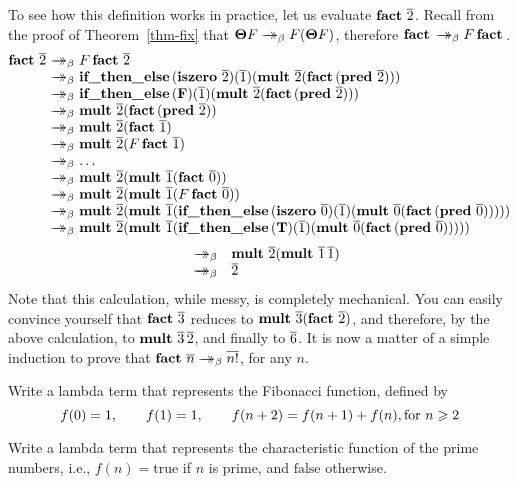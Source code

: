 \documentclass{article}
\begin{document}
To see how this definition works in practice, let us evaluate $\mathop{\textbf{\bf fact}\,}
\mathop{\overline{2}}$. Recall from the proof of Theorem~\ref{thm-fix} that
$\textbf{\boldmath $\Theta$} F\mathrel{\rightarrow\!\!\!\!\!\rightarrow}_{\beta} F(\textbf{\boldmath $\Theta$} F)$, therefore $\mathop{\textbf{\bf fact}\,} \mathrel{\rightarrow\!\!\!\!\!\rightarrow}_{\beta} F\mathop{\textbf{\bf fact}\,}$.
\[ \begin{array}{@{}r@{~}c@{~}l@{}}
  \factt\chnum{2}
  &\redbs& F\factt\chnum{2} \\
  &\redbs& \ifthenelset(\iszerot \chnum{2}) (\chnum{1}) 
  (\multt \chnum{2} (\factt (\predt \chnum{2}))) \\
  &\redbs& \ifthenelset (\falset) (\chnum{1}) 
  (\multt \chnum{2} (\factt (\predt \chnum{2}))) \\
  &\redbs& \multt \chnum{2} (\factt (\predt \chnum{2})) \\
  &\redbs& \multt \chnum{2} (\factt \chnum{1}) \\
  &\redbs& \multt \chnum{2} (F\factt \chnum{1}) \\
  &\redbs& \ldots \\
  &\redbs& \multt \chnum{2} (\multt \chnum{1} (\factt\chnum{0})) \\
  &\redbs& \multt \chnum{2} (\multt \chnum{1} (F\factt\chnum{0})) \\
  &\redbs& \multt \chnum{2} (\multt \chnum{1} (\ifthenelset(\iszerot
  \chnum{0}) (\chnum{1}) (\multt \chnum{0} (\factt (\predt \chnum{0}))))) \\
  &\redbs& \multt \chnum{2} (\multt \chnum{1} (\ifthenelset(\truet)
  (\chnum{1}) (\multt \chnum{0} (\factt (\predt \chnum{0}))))) \\
\end{array}\]\[\begin{array}{rcl}
  &\redbs& \multt \chnum{2} (\multt \chnum{1} \chnum{1}) \\
  &\redbs& \chnum{2}
\end{array}
\]
Note that this calculation, while messy, is completely mechanical. You
can easily convince yourself that $\mathop{\textbf{\bf fact}\,} \mathop{\overline{3}}$ reduces to
$\mathop{\textbf{\bf mult}\,} \mathop{\overline{3}} (\mathop{\textbf{\bf fact}\,} \mathop{\overline{2}})$, and therefore, by the above
calculation, to $\mathop{\textbf{\bf mult}\,} \mathop{\overline{3}} \mathop{\overline{2}}$, and finally to
$\mathop{\overline{6}}$. It is now a matter of a simple induction to prove that
$\mathop{\textbf{\bf fact}\,} \mathop{\overline{n}}\mathrel{\rightarrow\!\!\!\!\!\rightarrow}_{\beta} \mathop{\overline{n!}}$, for any $n$.

\begin{exercise}
  Write a lambda term that represents the Fibonacci
  function, defined by
  \[ f(0) = 1,\hspace{2em} f(1) = 1,\hspace{2em} f(n+2)=f(n+1)+f(n), \mbox{for $n\geqslant 2$}
  \]
\end{exercise}

\begin{exercise}
  Write a lambda term that represents the characteristic
  function of the prime numbers, i.e., $f(n)=\mbox{true}$ if $n$ is
  prime, and $\mbox{false}$ otherwise. 
\end{exercise}
\end{document}
